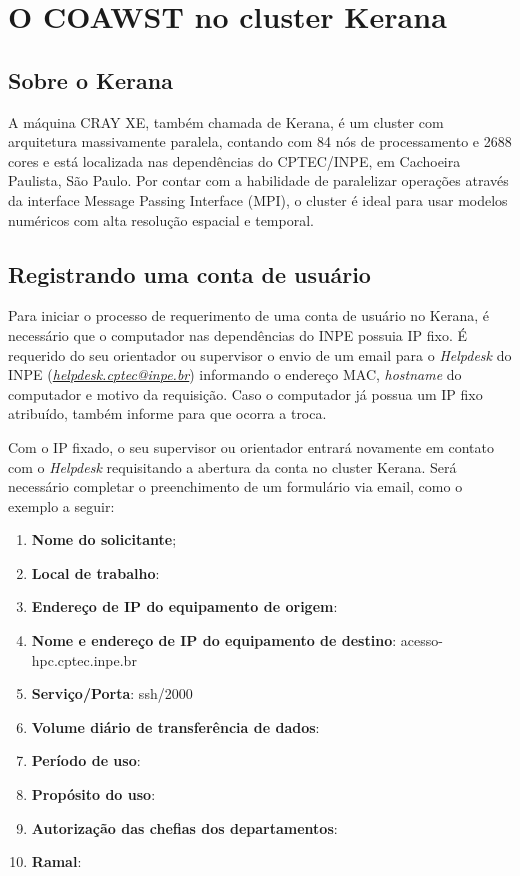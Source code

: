 
\chapter{O COAWST no cluster Kerana}
\bigskip

\section{Sobre o Kerana}
\bigskip

\noindent A máquina CRAY XE, também chamada de Kerana, é um cluster com arquitetura massivamente paralela,
contando com 84 nós de processamento e 2688 cores e está localizada nas dependências do CPTEC/INPE,
em Cachoeira Paulista, São Paulo. Por contar com a habilidade de paralelizar operações através da interface
Message Passing Interface (MPI), o cluster é ideal para usar modelos numéricos com alta resolução espacial
e temporal.
\bigskip

\section{Registrando uma conta de usuário}
\bigskip

\noindent Para iniciar o processo de requerimento de uma conta de usuário no Kerana, é necessário que o computador nas dependências do INPE possuia IP fixo. É requerido do seu orientador ou supervisor o envio de um email para o \textit{Helpdesk} do INPE  (\textcolor{bleu_cite}{\href{helpdesk.cptec@inpe.br}{\textit{helpdesk.cptec@inpe.br}}}) informando o endereço MAC, \textit{hostname} do computador e motivo da requisição. Caso o computador já possua um IP fixo atribuído, também informe para que ocorra a troca.
\bigskip

\noindent Com o IP fixado, o seu supervisor ou orientador entrará novamente em contato com o \textit{Helpdesk} requisitando a abertura da conta no cluster Kerana. Será necessário completar o preenchimento de um formulário via email, como o exemplo a seguir:
\bigskip
\begin{enumerate}
\item \textbf{Nome do solicitante};
\item \textbf{Local de trabalho}:
\item \textbf{Endereço de IP do equipamento de origem}:
\item \textbf{Nome e endereço de IP do equipamento de destino}: acesso-hpc.cptec.inpe.br
\item \textbf{Serviço/Porta}: ssh/2000
\item \textbf{Volume diário de transferência de dados}:
\item \textbf{Período de uso}:
\item \textbf{Propósito do uso}:
\item \textbf{Autorização das chefias dos departamentos}:
\item \textbf{Ramal}:
\end{enumerate}
\bigskip


